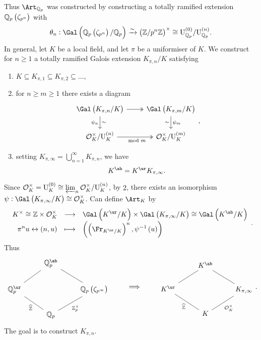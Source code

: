 Thus $ \Art_{\QQ_p} $ was constructed by constructing a totally ramified extension $ \QQ_p\br{\zeta_{p^n}} $ with
$$ \theta_n : \Gal\br{\QQ_p\br{\zeta_{p^n}} / \QQ_p} \xrightarrow{\sim} \br{\ZZ / p^n\ZZ}^\times \cong \U_{\QQ_p}^{\br{0}} / \U_{\QQ_p}^{\br{n}}. $$
In general, let $ K $ be a local field, and let $ \pi $ be a uniformiser of $ K $. We construct for $ n \ge 1 $ a totally ramified Galois extension $ K_{\pi, n} / K $ satisfying
\begin{enumerate}
\item $ K \subseteq K_{\pi, 1} \subseteq K_{\pi, 2} \subseteq \dots $,
\item for $ n \ge m \ge 1 $ there exists a diagram
$$
\begin{tikzcd}
\Gal\br{K_{\pi, n} / K} \arrow[twoheadrightarrow]{r} \arrow{d}{\sim}[swap]{\psi_n} & \Gal\br{K_{\pi, m} / K} \arrow{d}{\psi_m}[swap]{\sim} \\
\OOO_K^\times / \U_K^{\br{n}} \arrow[twoheadrightarrow]{r}[swap]{\mod m} & \OOO_K^\times / \U_K^{\br{m}}
\end{tikzcd},
$$
\item setting $ K_{\pi, \infty} = \bigcup_{n = 1}^\infty K_{\pi, n} $, we have
$$ K^{\ab} = K^{\ur}K_{\pi, \infty}. $$
\end{enumerate}
Since $ \OOO_K^\times = \U_K^{\br{0}} \cong \varprojlim_n \OOO_K^\times / \U_K^{\br{n}} $, by $ 2 $, there exists an isomorphism $ \psi : \Gal\br{K_{\pi, \infty} / K} \cong \OOO_K^\times $. Can define $ \Art_K $ by
$$ \function{K^\times \cong \ZZ \times \OOO_K^\times}{\Gal\br{K^{\ur} / K} \times \Gal\br{K_{\pi, \infty} / K} \cong \Gal\br{K^{\ab} / K}}{\pi^nu \leftrightarrow \br{n, u}}{\br{\br{\Fr_{K^{\ur} / K}}^n, \psi^{-1}\br{u}}}. $$
Thus
$$
\begin{tikzcd}
& \QQ_p^{\ab} \arrow[dash]{dl} \arrow[dash]{dr} & \\
\QQ_p^{\ur} \arrow[dash]{dr}[swap]{\widehat{\ZZ}} & & \QQ_p\br{\zeta_{p^\infty}} \arrow[dash]{dl}{\ZZ_p^\times} \\
& \QQ_p &
\end{tikzcd}
\qquad \implies \qquad
\begin{tikzcd}
& K^{\ab} \arrow[dash]{dl} \arrow[dash]{dr} & \\
K^{\ur} \arrow[dash]{dr}[swap]{\widehat{\ZZ}} & & K_{\pi, \infty} \arrow[dash]{dl}{\OOO_K^\times} \\
& K &
\end{tikzcd}.
$$
The goal is to construct $ K_{\pi, n} $.

